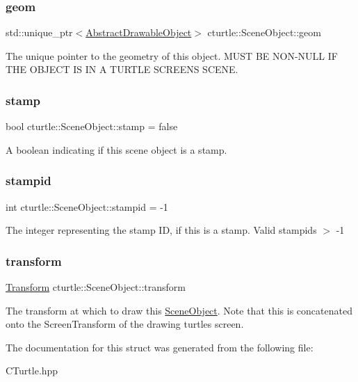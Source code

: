\subsubsection{\texorpdfstring{geom}{geom}}
{\footnotesize\ttfamily std\+::unique\+\_\+ptr$<$\hyperlink{classcturtle_1_1AbstractDrawableObject}{Abstract\+Drawable\+Object}$>$ cturtle\+::\+Scene\+Object\+::geom}

The unique pointer to the geometry of this object. M\+U\+ST BE N\+O\+N-\/\+N\+U\+LL IF T\+HE O\+B\+J\+E\+CT IS IN A T\+U\+R\+T\+LE S\+C\+R\+E\+EN\textquotesingle{}S S\+C\+E\+NE. \mbox{\label{structcturtle_1_1SceneObject_a014644aee0792d77bd84a0b98464f39b}} 
\subsubsection{\texorpdfstring{stamp}{stamp}}
{\footnotesize\ttfamily bool cturtle\+::\+Scene\+Object\+::stamp = false}

A boolean indicating if this scene object is a stamp. \mbox{\label{structcturtle_1_1SceneObject_ae6094918613e5d4d284805cd5afb2e65}} 
\subsubsection{\texorpdfstring{stampid}{stampid}}
{\footnotesize\ttfamily int cturtle\+::\+Scene\+Object\+::stampid = -\/1}

The integer representing the stamp ID, if this is a stamp. Valid stampids $>$ -\/1 \mbox{\label{structcturtle_1_1SceneObject_a427fb0ab63fa9e0dd5c7b5c15ac3f6f4}} 
\subsubsection{\texorpdfstring{transform}{transform}}
{\footnotesize\ttfamily \hyperlink{classcturtle_1_1Transform}{Transform} cturtle\+::\+Scene\+Object\+::transform}

The transform at which to draw this \hyperlink{structcturtle_1_1SceneObject}{Scene\+Object}. Note that this is concatenated onto the Screen\+Transform of the drawing turtle\textquotesingle{}s screen. 

The documentation for this struct was generated from the following file\+:\begin{DoxyCompactItemize}
\item 
C\+Turtle.\+hpp\end{DoxyCompactItemize}
